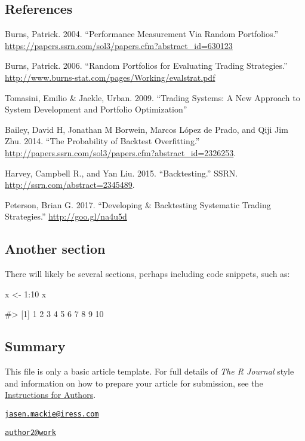\hypertarget{references}{%
\subsection{References}\label{references}}

Burns, Patrick. 2004. ``Performance Measurement Via Random Portfolios.''
\url{https://papers.ssrn.com/sol3/papers.cfm?abstract_id=630123}

Burns, Patrick. 2006. ``Random Portfolios for Evaluating Trading
Strategies.''
\url{http://www.burns-stat.com/pages/Working/evalstrat.pdf}

Tomasini, Emilio \& Jaekle, Urban. 2009. ``Trading Systems: A New
Approach to System Development and Portfolio Optimization''

Bailey, David H, Jonathan M Borwein, Marcos López de Prado, and Qiji Jim
Zhu. 2014. ``The Probability of Backtest Overfitting.''
\url{http://papers.ssrn.com/sol3/papers.cfm?abstract_id=2326253}.

Harvey, Campbell R., and Yan Liu. 2015. ``Backtesting.'' SSRN.
\url{http://ssrn.com/abstract=2345489}.

Peterson, Brian G. 2017. ``Developing \& Backtesting Systematic Trading
Strategies.'' \url{http://goo.gl/na4u5d}

\hypertarget{another-section}{%
\subsection{Another section}\label{another-section}}

There will likely be several sections, perhaps including code snippets,
such as:

\begin{Schunk}
\begin{Sinput}
x <- 1:10
x
\end{Sinput}
\begin{Soutput}
#>  [1]  1  2  3  4  5  6  7  8  9 10
\end{Soutput}
\end{Schunk}

\hypertarget{summary}{%
\subsection{Summary}\label{summary}}

This file is only a basic article template. For full details of
\emph{The R Journal} style and information on how to prepare your
article for submission, see the
\href{https://journal.r-project.org/share/author-guide.pdf}{Instructions
for Authors}.




\address{%
Jasen Mackie\\
Affiliation\\
line 1\\ line 2\\
}
\href{mailto:jasen.mackie@iress.com}{\nolinkurl{jasen.mackie@iress.com}}

\address{%
Author Two\\
Brian G. Peterson\\
line 1\\ line 2\\
}
\href{mailto:author2@work}{\nolinkurl{author2@work}}


